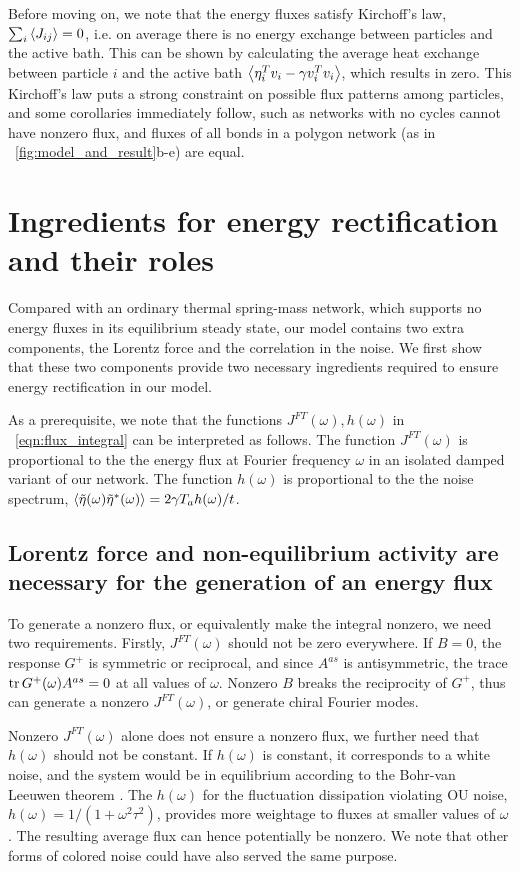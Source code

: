 \documentclass[
 preprint,
 preprintnumbers,
 amsmath,amssymb,
 aps,
 pre,
 longbibliography,
 superscriptaddress,
 10pt, twocolumn
]{revtex4-1}
\begin{document}
Before moving on, we note that the energy fluxes satisfy Kirchoff's law, $\sum_i \expval{J_{ij}} = 0$, i.e. on average there is no energy exchange between particles and the active bath. This can be shown by calculating the average heat exchange between particle $i$ and the active bath $\expval{\eta_i^T v_i - \gamma v_i^T v_i}$, which results in zero.
This Kirchoff's law puts a strong constraint on possible flux patterns among particles, and some corollaries immediately follow, such as networks with no cycles cannot have nonzero flux, and fluxes of all bonds in a polygon network (as in \figurename~\ref{fig:model_and_result}b-e) are equal.


\section{Ingredients for energy rectification and their roles} \label{sec:fourier}

Compared with an ordinary thermal spring-mass network, which supports no energy fluxes in its equilibrium steady state, our model contains two extra components, the Lorentz force and the correlation in the noise.
We first show that these two components provide two necessary ingredients required to ensure energy rectification in our model.

As a prerequisite, we note that the functions $J^{FT}(\omega), h(\omega)$ in \eqnname~\eqref{eqn:flux_integral} can be interpreted as follows.
The function $J^{FT}(\omega)$ is proportional to the the energy flux at Fourier frequency $\omega$ in an isolated damped variant of our network.
The function $h(\omega)$ is proportional to the the noise spectrum, $\expval{\tilde{\eta}(\omega)\tilde{\eta}^*(\omega)} = 2\gamma T_a h(\omega) / t$.


\subsection{Lorentz force and non-equilibrium activity are necessary for the generation of an energy flux} To generate a nonzero flux, or equivalently make the integral nonzero, we need two requirements.
Firstly, $J^{FT}(\omega)$ should not be zero everywhere.
If $B=0$, the response $G^+$ is symmetric or reciprocal, and since $A^{as}$ is antisymmetric, the trace $\tr G^+(\omega) A^{as}=0$ at all values of $\omega$. Nonzero $B$ breaks the reciprocity of $G^+$, thus can generate a nonzero $J^{FT}(\omega)$, or generate chiral Fourier modes.

Nonzero $J^{FT}(\omega)$ alone does not ensure a nonzero flux, we further need that $h(\omega)$ should not be constant.
If $h(\omega)$ is constant, it corresponds to a white noise, and the system would be in equilibrium according to the Bohr-van Leeuwen theorem \cite{Pradhan2010NonexistenceClassical}.
The $h(\omega)$ for the fluctuation dissipation violating OU noise, $h(\omega)=1/(1+\omega^2\tau^2)$, provides more weightage to fluxes at smaller values of $\omega$. The resulting average flux can hence potentially be nonzero. We note that other forms of colored noise could have also served the same purpose.
\end{document}
